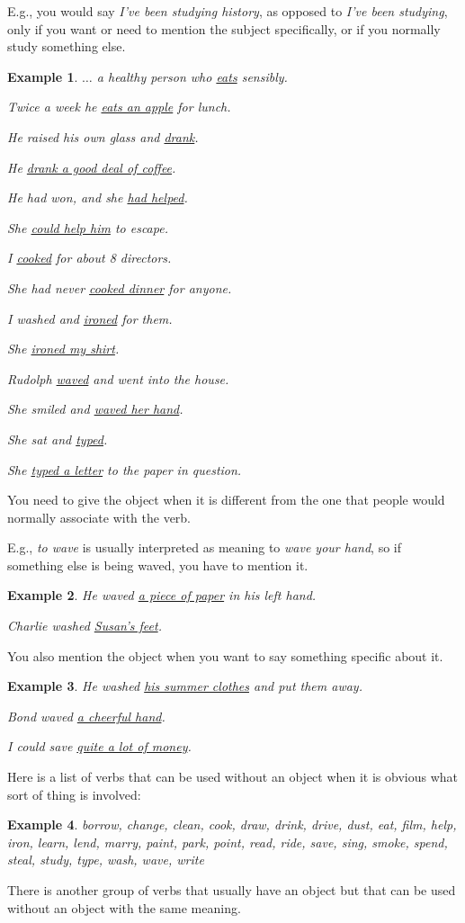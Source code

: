 \documentclass[oneside]{book}
\numberwithin{equation}{section}
\newtheorem{example}{Example}[section]
\begin{document}
E.g., you would say \textit{I've been studying history}, as opposed to \textit{I've been studying}, only if you want or need to mention the subject specifically, or if you normally study something else.
\begin{example}
    $\ldots$ a healthy person who \underline{eats} sensibly.
    
    Twice a week he \underline{eats an apple} for lunch.
    
    He raised his own glass and \underline{drank}.
    
    He \underline{drank a good deal of coffee}.
    
    He had won, and she \underline{had helped}.
    
    She \underline{could help him} to escape.
    
    I \underline{cooked} for about 8 directors.
    
    She had never \underline{cooked dinner} for anyone.
    
    I washed and \underline{ironed} for them.
    
    She \underline{ironed my shirt}.
    
    Rudolph \underline{waved} and went into the house.
    
    She smiled and \underline{waved her hand}.
    
    She sat and \underline{typed}.
    
    She \underline{typed a letter} to the paper in question.
\end{example}
You need to give the object when it is different from the one that people would normally associate with the verb.

E.g., \textit{to wave} is usually interpreted as meaning to \textit{wave your hand}, so if something else is being waved, you have to mention it.
\begin{example}
    He waved \underline{a piece of paper} in his left hand.
    
    Charlie washed \underline{Susan's feet}.
\end{example}
You also mention the object when you want to say something specific about it.
\begin{example}
    He washed \underline{his summer clothes} and put them away.
    
    Bond waved \underline{a cheerful hand}.
    
    I could save \underline{quite a lot of money}.
\end{example}
%
\noindent{} Here is a list of verbs that can be used without an object when it is obvious what sort of thing is involved:
\begin{example}
    borrow, change, clean, cook, draw, drink, drive, dust, eat, film, help, iron, learn, lend, marry, paint, park, point, read, ride, save, sing, smoke, spend, steal, study, type, wash, wave, write
\end{example}
%
\noindent{} There is another group of verbs that usually have an object but that can be used without an object with the same meaning.
\end{document}
